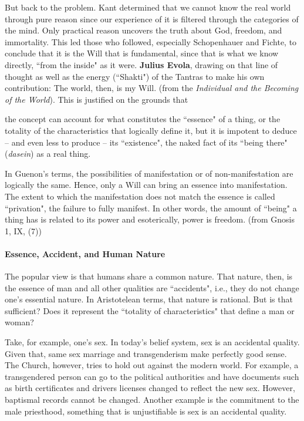 But back to the problem. Kant determined that we cannot know the real world through pure reason since our experience of it is filtered through the categories of the mind. Only practical reason uncovers the truth about God, freedom, and immortality. This led those who followed, especially Schopenhauer and Fichte, to conclude that it is the Will that is fundamental, since that is what we know directly, ``from the inside" as it were. \textbf{Julius Evola}, drawing on that line of thought as well as the energy (``Shakti") of the Tantras to make his own contribution: The world, then, is my Will. (from the \emph{Individual and the Becoming of the World}). This is justified on the grounds that

\begin{quotex}
the concept can account for what constitutes the ``essence" of a thing, or the totality of the characteristics that logically define it, but it is impotent to deduce – and even less to produce – its ``existence", the naked fact of its ``being there" (\emph{dasein}) as a real thing. 

\end{quotex}
In Guenon's terms, the possibilities of manifestation or of non-manifestation are logically the same. Hence, only a Will can bring an essence into manifestation. The extent to which the manifestation does not match the essence is called ``privation", the failure to fully manifest. In other words, the amount of ``being" a thing has is related to its power and esoterically, power is freedom. (from Gnosis 1, IX, (7))

\paragraph{Essence, Accident, and Human Nature}
The popular view is that humans share a common nature. That nature, then, is the essence of man and all other qualities are ``accidents", i.e., they do not change one's essential nature. In Aristotelean terms, that nature is rational. But is that sufficient? Does it represent the ``totality of characteristics" that define a man or woman?

Take, for example, one's sex. In today's belief system, sex is an accidental quality. Given that, same sex marriage and transgenderism make perfectly good sense. The Church, however, tries to hold out against the modern world. For example, a transgendered person can go to the political authorities and have documents such as birth certificates and drivers licenses changed to reflect the new sex. However, baptismal records cannot be changed. Another example is the commitment to the male priesthood, something that is unjustifiable is sex is an accidental quality.

